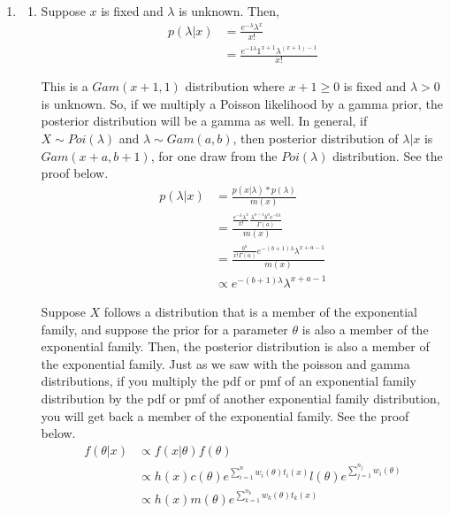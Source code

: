 \documentclass[12pt]{article}\usepackage[]{graphicx}\usepackage[]{color}
\newenvironment{knitrout}{}{} %
\begin{document}
\begin{doublespacing}
\begin{enumerate}
\begin{center}
\begin{singlespace}
\begin{knitrout}
\end{knitrout}
\end{singlespace}
\end{center}

\item \begin{enumerate}

\item Suppose $x$ is fixed and $\lambda$ is unknown. Then,
\begin{align*}
p(\lambda|x) &= \frac{e^{-\lambda}\lambda^x}{x!} \\
&= \frac{e^{-1\lambda}1^{x+1}\lambda^{(x+1)-1}}{x!}
\end{align*}

This is a $Gam(x+1, 1)$ distribution where $x+1\geq0$ is fixed and $\lambda > 0$ is unknown. So, if we multiply a Poisson likelihood by a gamma prior, the posterior distribution will be a gamma as well.  In general, if $X \sim Poi(\lambda)$ and $\lambda \sim Gam(a, b)$, then posterior distribution of $\lambda|x$ is $Gam(x+a, b+1)$, for one draw from the $Poi(\lambda)$ distribution. See the proof below.
\begin{align*}
p(\lambda|x) &= \frac{p(x|\lambda)*p(\lambda)}{m(x)} \\
&= \frac{\frac{e^{-\lambda}\lambda^x}{x!}\frac{\lambda^{a-1}b^ae^{-b\lambda}}{\Gamma(a)}}{m(x)} \\
&= \frac{\frac{b^a}{x!\Gamma(a)}e^{-(b+1)\lambda}\lambda^{x+a-1}}{m(x)} \\
&\propto e^{-(b+1)\lambda}\lambda^{x+a-1} 
\end{align*}

Suppose $X$ follows a distribution that is a member of the exponential family, and suppose the prior for a parameter $\theta$ is also a member of the exponential family. Then, the posterior distribution is also a member of the exponential family. Just as we saw with the poisson and gamma distributions, if you multiply the pdf or pmf of an exponential family distribution by the pdf or pmf of another exponential family distribution, you will get back a member of the exponential family. See the proof below.
\begin{align*}
f(\theta|x) &\propto f(x|\theta)f(\theta) \\
&\propto h(x)c(\theta)e^{\sum_{i=1}^{n}w_i(\theta)t_i(x)}l(\theta)e^{\sum_{j=1}^{n_j}w_i(\theta)} \\
&\propto h(x)m(\theta)e^{\sum_{k=1}^{n_k}w_k(\theta)t_k(x)} 
\end{align*}


\end{enumerate}
\end{enumerate}
\end{doublespacing}
\end{document}
